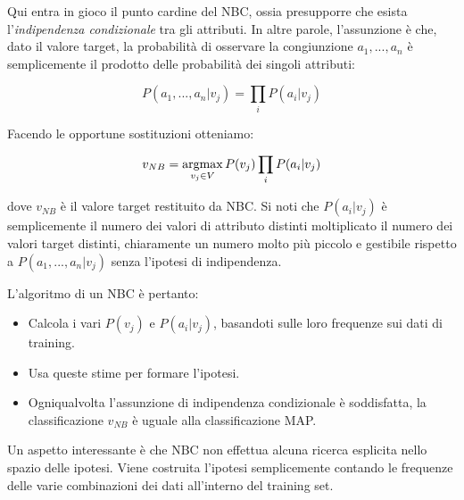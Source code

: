 Qui entra in gioco il punto cardine del NBC, ossia presupporre che esista l'\emph{indipendenza condizionale} tra gli attributi. In altre parole, l'assunzione è che, dato il valore target, la probabilità di osservare la congiunzione $a_1, ..., a_n$ è semplicemente il prodotto delle probabilità dei singoli attributi:

$$ P(a_1, ..., a_n | v_j) = \prod_i P(a_i|v_j) $$

\noindent
Facendo le opportune sostituzioni otteniamo:

$$ v_{NB} = \operatorname*{argmax}_{v_j \in V} P(v_j) \prod_i P(a_i|v_j) $$

dove $v_{NB}$ è il valore target restituito da NBC. Si noti che $P(a_i|v_j)$ è semplicemente il numero dei valori di attributo distinti moltiplicato il numero dei valori target distinti, chiaramente un numero molto più piccolo e gestibile rispetto a $P(a_1, ..., a_n | v_j)$ senza l'ipotesi di indipendenza. 

L'algoritmo di un NBC è pertanto:
\begin{itemize}
	\item Calcola i vari $P(v_j)$ e $P(a_i|v_j)$, basandoti sulle loro frequenze sui dati di training.
	\item Usa queste stime per formare l'ipotesi.
	\item Ogniqualvolta l'assunzione di indipendenza condizionale è soddisfatta, la classificazione $v_{NB}$ è uguale alla classificazione MAP.
\end{itemize}

Un aspetto interessante è che NBC non effettua alcuna ricerca esplicita nello spazio delle ipotesi. Viene costruita l'ipotesi semplicemente contando le frequenze delle varie combinazioni dei dati all'interno del training set.